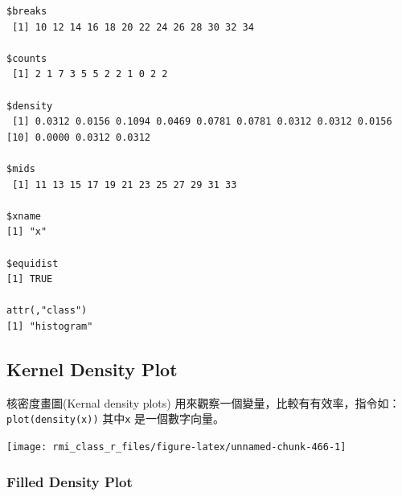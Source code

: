 \documentclass[]{book}
\newenvironment{Shaded}{\begin{snugshade}}{\end{snugshade}}
\newcommand{\CommentTok}[1]{\textcolor[rgb]{0.56,0.35,0.01}{\textit{#1}}}
\newcommand{\DataTypeTok}[1]{\textcolor[rgb]{0.13,0.29,0.53}{#1}}
\newcommand{\KeywordTok}[1]{\textcolor[rgb]{0.13,0.29,0.53}{\textbf{#1}}}
\newcommand{\NormalTok}[1]{#1}
\newcommand{\OperatorTok}[1]{\textcolor[rgb]{0.81,0.36,0.00}{\textbf{#1}}}
\newcommand{\StringTok}[1]{\textcolor[rgb]{0.31,0.60,0.02}{#1}}
\theoremstyle{definition}
\theoremstyle{definition}
\theoremstyle{definition}
\theoremstyle{remark}
\begin{document}
\begin{verbatim}
$breaks
 [1] 10 12 14 16 18 20 22 24 26 28 30 32 34

$counts
 [1] 2 1 7 3 5 5 2 2 1 0 2 2

$density
 [1] 0.0312 0.0156 0.1094 0.0469 0.0781 0.0781 0.0312 0.0312 0.0156
[10] 0.0000 0.0312 0.0312

$mids
 [1] 11 13 15 17 19 21 23 25 27 29 31 33

$xname
[1] "x"

$equidist
[1] TRUE

attr(,"class")
[1] "histogram"
\end{verbatim}

\hypertarget{kernel-density-plot}{%
\subsection{Kernel Density Plot}\label{kernel-density-plot}}

核密度畫圖(Kernal density plots)
用來觀察一個變量，比較有有效率，指令如：\texttt{plot(density(x))}
其中\texttt{x} 是一個數字向量。

\begin{Shaded}
\end{Shaded}

\begin{center}\texttt{[image: rmi\_class\_r\_files/figure-latex/unnamed-chunk-466-1]} \end{center}

\hypertarget{filled-density-plot}{%
\subsubsection{Filled Density Plot}\label{filled-density-plot}}

\begin{Shaded}
\end{Shaded}
\end{document}
